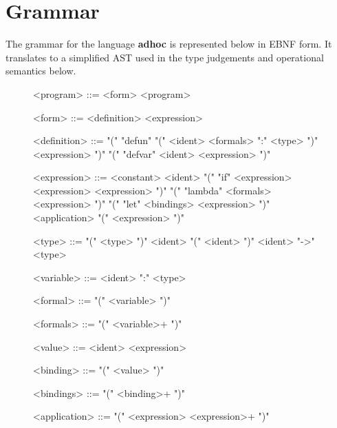 \documentclass[11pt,a4paper]{article}
\begin{document}
\section{Grammar}

The grammar for the language \textbf{adhoc} is represented below in
EBNF form. It translates to a simplified AST used in the type judgements
and operational semantics below.


\begin{figure}[H]
\small
\setlength{\grammarindent}{8em}
\renewcommand{\grammarlabel}[2]{\synt{#1}\hfill#2}
\begin{grammar}
<program> ::= <form> <program>

<form> ::= <definition>
    \alt <expression>

<definition> ::= "(" "defun" "(" <ident> <formals> ":" <type> ")" <expression> ")"
    \alt "(" "defvar" <ident> <expression> ")"



<expression> ::= <constant>
    \alt <ident>
    \alt "(" "if" <expression> <expression> <expression> ")"
    \alt "(" "lambda" <formals> <expression> ")"
    \alt "(" "let" <bindings> <expression> ")"
    \alt <application>
    \alt "(" <expression> ")"

<type> ::= "(" <type> ")"
    \alt <ident>
    \alt "(" <ident> ")"
    \alt <ident> "->" <type>

<variable> ::= <ident> ":" <type>

<formal> ::= "(" <variable> ")"

<formals> ::= "(" <variable>+ ")"

<value> ::= <ident> <expression>

<binding> ::= "(" <value> ")"

<bindings> ::= "(" <binding>+ ")"

<application> ::= "(" <expression> <expression>+ ")"
\end{grammar}
\end{figure}


\end{document}
